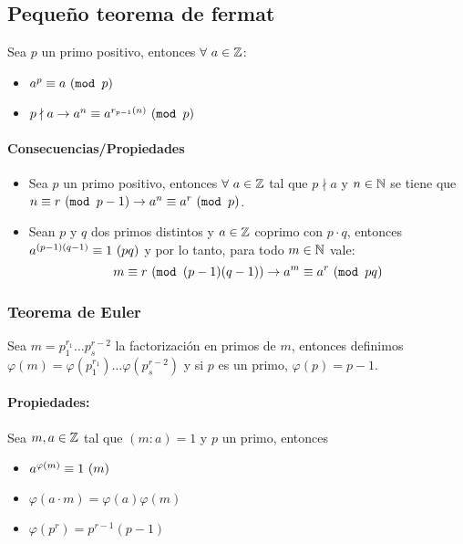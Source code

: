 \subsection{Pequeño teorema de fermat}

Sea $p$ un primo positivo, entonces $\forall~a\in\mathbb{Z}$:
\begin{itemize}
\item $a^p \equiv a ~(\texttt{mod } p)$
\item $p\nmid a\to a^{n} \equiv a^{r_{p-1}(n)} ~(\texttt{mod } p)$
\end{itemize}

\paragraph{Consecuencias/Propiedades}
\begin{itemize}
\item Sea $p$ un primo positivo, entonces $\forall~a\in\mathbb{Z}$ tal que $p\nmid a$ y $n\in\mathbb{N}$ se tiene que $n \equiv r ~(\texttt{mod } p-1)\to a^n \equiv a^{r} ~(\texttt{mod } p)$.
\item Sean $p$ y $q$ dos primos distintos y $a\in\mathbb{Z}$ coprimo con $p\cdot q$, entonces $a^{(p-1)(q-1)} \equiv 1 ~(pq)$ y por lo tanto, para todo $m\in\mathbb{N}$ vale:
$$m \equiv r ~(\texttt{mod } (p-1)(q-1))\to a^m \equiv a^r ~(\texttt{mod } pq)$$
\end{itemize}

\subsubsection{Teorema de Euler}
Sea $m = p_1^{r_1}\dots p_s^{r-2}$ la factorización en primos de $m$, entonces definimos \newline $\varphi(m) = \varphi(p_1^{r_1})\dots \varphi(p_s^{r-2})$ y si $p$ es un primo, $\varphi(p) = p-1$.

\paragraph{Propiedades:} Sea $m,a\in\mathbb{Z}$ tal que $(m:a)=1$ y $p$ un primo, entonces
\begin{itemize}
\item $a^{\varphi(m)} \equiv 1 ~(m)$
\item $\varphi(a\cdot m) = \varphi(a)\varphi(m)$    
\item $\varphi(p^{r}) = p^{r-1}(p-1)$
\end{itemize}

